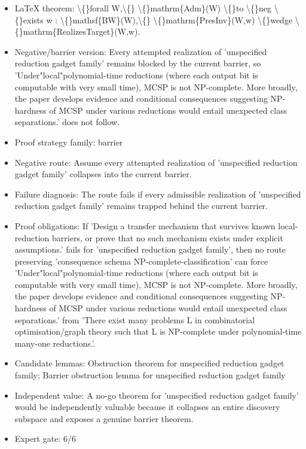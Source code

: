 \documentclass[11pt]{article}
\begin{document}
\begin{itemize}
\item LaTeX theorem: \textbackslash\{\}forall W,\textbackslash\{\} \textbackslash\{\}mathrm\{Adm\}(W) \textbackslash\{\}to \textbackslash\{\}neg \textbackslash\{\}exists w : \textbackslash\{\}mathsf\{BW\}(W),\textbackslash\{\} \textbackslash\{\}mathrm\{PresInv\}(W,w) \textbackslash\{\}wedge \textbackslash\{\}mathrm\{RealizesTarget\}(W,w).
\item Negative/barrier version: Every attempted realization of 'unspecified reduction gadget family' remains blocked by the current barrier, so 'Under"local"polynomial-time reductions (where each output bit is computable with very small time), MCSP is not NP-complete. More broadly, the paper develops evidence and conditional consequences suggesting NP-hardness of MCSP under various reductions would entail unexpected class separations.' does not follow.
\item Proof strategy family: barrier
\item Negative route: Assume every attempted realization of 'unspecified reduction gadget family' collapses into the current barrier.
\item Failure diagnosis: The route fails if every admissible realization of 'unspecified reduction gadget family' remains trapped behind the current barrier.
\item Proof obligations: If 'Design a transfer mechanism that survives known local-reduction barriers, or prove that no such mechanism exists under explicit assumptions.' fails for 'unspecified reduction gadget family', then no route preserving 'consequence schema NP-complete-classification' can force 'Under"local"polynomial-time reductions (where each output bit is computable with very small time), MCSP is not NP-complete. More broadly, the paper develops evidence and conditional consequences suggesting NP-hardness of MCSP under various reductions would entail unexpected class separations.' from 'There exist many problems L in combinatorial optimisation/graph theory such that L is NP-complete under polynomial-time many-one reductions.'.
\item Candidate lemmas: Obstruction theorem for unspecified reduction gadget family; Barrier obstruction lemma for unspecified reduction gadget family
\item Independent value: A no-go theorem for 'unspecified reduction gadget family' would be independently valuable because it collapses an entire discovery subspace and exposes a genuine barrier theorem.
\item Expert gate: 6/6
\end{itemize}
\end{document}
